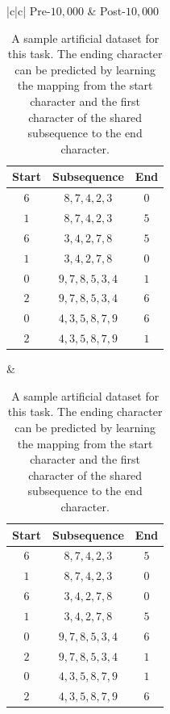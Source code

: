 \documentclass{article}
\begin{document}
\begin{table}[H]
    \centering
    \begin{tabular}{|c|c|} \hline
        Pre-$10,000$ & Post-$10,000$  \\ \hline
        \begin{tabular}{|c|c|c|}
            Start & Subsequence & End \\ \hline
            $6$ & $8, 7, 4, 2, 3$ & $0$ \\ \hline
            $1$ & $8, 7, 4, 2, 3$ & $5$ \\ \hline
            $6$ & $3, 4, 2, 7, 8$ & $5$ \\ \hline
            $1$ & $3, 4, 2, 7, 8$ & $0$ \\ \hline
            $0$ & $9, 7, 8, 5, 3, 4$ & $1$ \\ \hline
            $2$ & $9, 7, 8, 5, 3, 4$ & $6$ \\ \hline
            $0$ & $4, 3, 5, 8, 7, 9$ & $6$ \\ \hline
            $2$ & $4, 3, 5, 8, 7, 9$ & $1$ \\ \hline
        \end{tabular} &  \begin{tabular}{|c|c|c|}
            Start & Subsequence & End \\ \hline
            $6$ & $8, 7, 4, 2, 3$ & $5$ \\ \hline
            $1$ & $8, 7, 4, 2, 3$ & $0$ \\ \hline
            $6$ & $3, 4, 2, 7, 8$ & $0$ \\ \hline
            $1$ & $3, 4, 2, 7, 8$ & $5$ \\ \hline
            $0$ & $9, 7, 8, 5, 3, 4$ & $6$ \\ \hline
            $2$ & $9, 7, 8, 5, 3, 4$ & $1$ \\ \hline
            $0$ & $4, 3, 5, 8, 7, 9$ & $1$ \\ \hline
            $2$ & $4, 3, 5, 8, 7, 9$ & $6$ \\ \hline
        \end{tabular}\\ \hline
    \end{tabular}
    \caption{A sample artificial dataset for this task. The ending character can be predicted by learning the mapping from the start character and the first character of the shared subsequence to the end character.}
    \label{tab:dataset}
\end{table}
\end{document}
